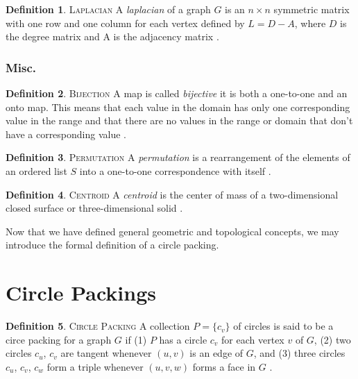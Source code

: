 \documentclass[11pt]{article}
\theoremstyle{definition}
\newtheorem{definition}{Definition}[section]
\begin{document}
	\theoremstyle{definition}
	\begin{definition}{\textsc{Laplacian}}
		A \emph{laplacian} of a graph $G$ is an $n \times n$ symmetric matrix with one row and one column for each vertex defined by $L = D - A$, where $D$ is the degree matrix and A is the adjacency matrix \cite{mathworld:Laplacian}.
	\end{definition}

\subsubsection{Misc.}
	\theoremstyle{definition}
	\begin{definition}{\textsc{Bijection}}
		A map is called \emph{bijective} it is both a one-to-one and an onto map. 
		This means that each value in the domain has only one corresponding value in the range and that there are no values in the range or domain that don't have a corresponding value \cite{mathworld:Bijection}. 
	\end{definition}
	
	\theoremstyle{definition}
	\begin{definition}{\textsc{Permutation}}
		 A \emph{permutation} is a rearrangement of the elements of an ordered list $S$ into a one-to-one correspondence with itself \cite{mathworld:Permutation}.
	\end{definition}
	
	\theoremstyle{definition}
	\begin{definition}{\textsc{Centroid}}
		A \emph{centroid} is the center of mass of a two-dimensional closed surface or three-dimensional solid \cite{mathworld:Centroid}.
	\end{definition}
	Now that we have defined general geometric and topological concepts, we may introduce the formal definition of a circle packing.

\section{Circle Packings}
	\theoremstyle{definition}
	\begin{definition}{\textsc{Circle Packing}}
		A collection $P = \{c_v\}$ of circles is said to be a circe packing for a graph $G$ if 
		(1) $P$ has a circle $c_v$ for each vertex $v$ of $G$, 
		(2) two circles $c_u$, $c_v$ are tangent whenever $(u,v)$ is an edge of $G$, and 
		(3) three circles $c_u$, $c_v$, $c_w$ form a triple whenever $(u,v,w)$ forms a face in $G$ \cite{stephenson05introduction}.
	\end{definition}
\end{document}
